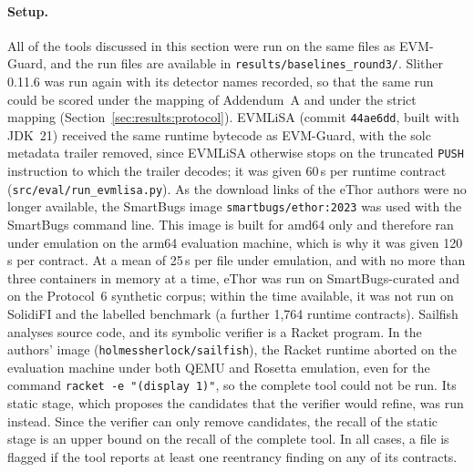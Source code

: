 \documentclass[pdflatex,sn-mathphys]{sn-jnl}
\theoremstyle{thmstyletwo}
\theoremstyle{thmstyletwo}
\begin{document}
\paragraph{Setup.} All of the tools discussed in this section were run on the same files as EVM-Guard, and the run files are available in \texttt{results/baselines\_round3/}. Slither 0.11.6 was run again with its detector names recorded, so that the same run could be scored under the mapping of Addendum~A and under the strict mapping (Section~\ref{sec:results:protocol}). EVMLiSA (commit \texttt{44ae6dd}, built with JDK~21) received the same runtime bytecode as EVM-Guard, with the solc metadata trailer removed, since EVMLiSA otherwise stops on the truncated \texttt{PUSH} instruction to which the trailer decodes; it was given 60\,s per runtime contract (\texttt{src/eval/run\_evmlisa.py}). As the download links of the eThor authors were no longer available, the SmartBugs image \texttt{smartbugs/ethor:2023} was used with the SmartBugs command line. This image is built for amd64 only and therefore ran under emulation on the arm64 evaluation machine, which is why it was given 120\,s per contract. At a mean of 25\,s per file under emulation, and with no more than three containers in memory at a time, eThor was run on SmartBugs-curated and on the Protocol~6 synthetic corpus; within the time available, it was not run on SolidiFI and the labelled benchmark (a further 1,764 runtime contracts). Sailfish analyses source code, and its symbolic verifier is a Racket program. In the authors' image (\texttt{holmessherlock/sailfish}), the Racket runtime aborted on the evaluation machine under both QEMU and Rosetta emulation, even for the command \texttt{racket -e "(display 1)"}, so the complete tool could not be run. Its static stage, which proposes the candidates that the verifier would refine, was run instead. Since the verifier can only remove candidates, the recall of the static stage is an upper bound on the recall of the complete tool. In all cases, a file is flagged if the tool reports at least one reentrancy finding on any of its contracts.
\end{document}
